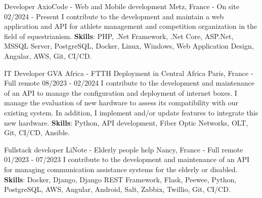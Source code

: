 

\begin{cventries}

  \cventry
    {Developer} %
    {AxioCode - Web and Mobile development} %
    {Metz, France - On site} %
    {02/2024 - Present} %
    {
        I contribute to the development and maintain a web application and API for athlete management and competition organization in the field of equestrianism.
        \newline
        \textbf{Skills}: PHP, .Net Framework, .Net Core, ASP.Net, MSSQL Server, PostgreSQL, Docker, Linux, Windows, Web Application Design, Angular, AWS, Git, CI/CD.
    }

  \cventry
    {IT Developer} %
    {GVA Africa - FTTH Deployment in Central Africa} %
    {Paris, France - Full remote} %
    {08/2023 - 02/2024} %
    {
        I contribute to the development and maintenance of an API to manage the configuration and deployment of internet boxes. 
        \newline
        I manage the evaluation of new hardware to assess its compatibility with our existing system. 
        \newline
        In addition, I implement and/or update features to integrate this new hardware.
        \newline
        \textbf{Skills}: Python, API development, Fiber Optic Networks, OLT, Git, CI/CD, Ansible.
    }

  \cventry
    {Fullstack developer} %
    {LiNote - Elderly people help} %
    {Nancy, France - Full remote} %
    {01/2023 - 07/2023} %
    {
        I contribute to the development and maintenance of an API for managing communication assistance systems for the elderly or disabled.
        \newline
        \textbf{Skills}: Docker, Django, Django REST Framework, Flask, Peewee, Python, PostgreSQL, AWS, Angular, Android, Salt, Zabbix, Twillio, Git, CI/CD.
    }


\end{cventries}
